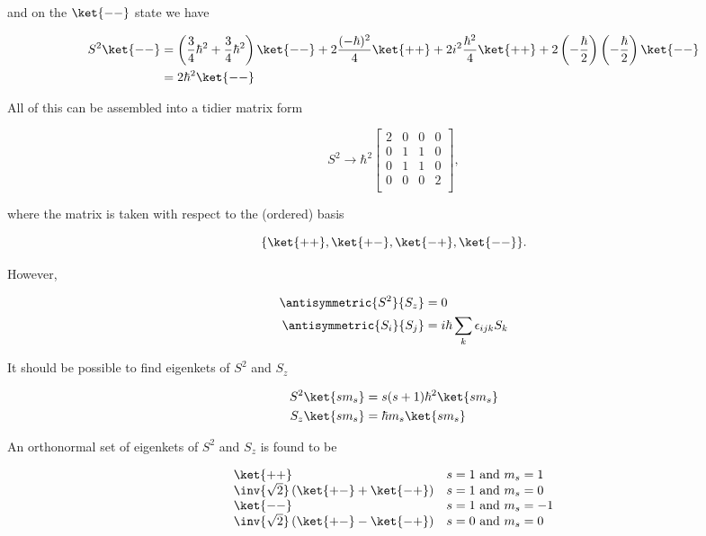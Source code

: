 and on the $\ket{--}$ state we have

\begin{align*}
S^2 \ket{--} 
&=
\left(\frac{3}{4}\hbar^2 +\frac{3}{4}\hbar^2\right)
\ket{--} 
+ 2 \frac{(-\hbar)^2}{4} 
\ket{++} 
+ 2 i^2 \frac{\hbar^2}{4} \ket{++} 
+2 
\left(-\frac{\hbar}{2}\right)
\left(-\frac{\hbar}{2}\right)
\ket{--} \\
&=
2 \hbar^2 \ket{--} 
\end{align*}

All of this can be assembled into a tidier matrix form

\begin{equation}\label{eqn:qmTwoL16:450}
S^2
\rightarrow 
\hbar^2
\begin{bmatrix}
2 & 0 & 0 & 0 \\
0 & 1 & 1 & 0 \\
0 & 1 & 1 & 0 \\
0 & 0 & 0 & 2 \\
\end{bmatrix},
\end{equation}

where the matrix is taken with respect to the (ordered) basis

\begin{equation}\label{eqn:qmTwoL16:470}
\{
\ket{++},
\ket{+-},
\ket{-+},
\ket{--}
\}.
\end{equation}

However, 

\begin{align}\label{eqn:qmTwoL16:490}
\antisymmetric{S^2}{S_z} &= 0 \\
\antisymmetric{S_i}{S_j} &= i \hbar \sum_k \epsilon_{ijk} S_k
\end{align}

It should be possible to find eigenkets of $S^2$ and $S_z$

\begin{align}\label{eqn:qmTwoL16:510}
S^2 \ket{s m_s} &= s(s+1)\hbar^2 \ket{s m_s} \\
S_z \ket{s m_s} &= \hbar m_s \ket{s m_s} 
\end{align}

An orthonormal set of eigenkets of $S^2$ and $S_z$ is found to be

\begin{equation}\label{eqn:qmTwoL16:530}
\begin{array}{l l}
\ket{++} 
& \mbox{$s = 1$ and $m_s = 1$} \\
\inv{\sqrt{2}} \left( \ket{+-} + \ket{-+} \right) 
& \mbox{$s = 1$ and $m_s = 0$} \\
\ket{--} 
& \mbox{$s = 1$ and $m_s = -1$} \\
\inv{\sqrt{2}} \left( \ket{+-} - \ket{-+} \right) 
& \mbox{$s = 0$ and $m_s = 0$}
\end{array}
\end{equation}

